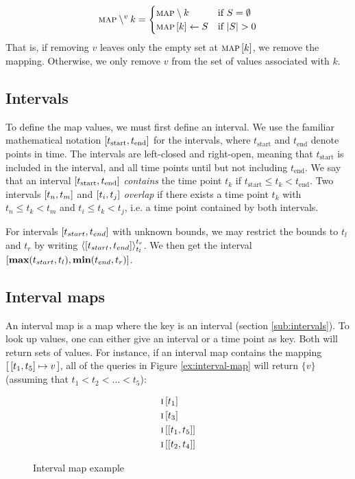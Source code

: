 \[
  \textsc{map} \setminus^{v} k =
  \begin{cases}
    \textsc{map} \setminus k & \text{if } S = \emptyset\\
    \textsc{map} \left[ k \right] \leftarrow S & \text{if } |S| > 0
  \end{cases}
\]
That is, if removing $v$ leaves only the empty set at $\textsc{map} \left[ k \right]$, we remove the mapping. Otherwise, we only remove $v$ from the set of values associated with $k$. 

\subsection{Intervals}
\label{sub:intervals}
To define the map values, we must first define an interval. We use the familiar mathematical notation $\interval{t_\text{start}}{t_\text{end}}$ for the intervals, where $t_\text{start}$ and $t_\text{end}$ denote points in time. The intervals are left-closed and right-open, meaning that $t_\text{start}$ is included in the interval, and all time points until but not including $t_\text{end}$. We say that an interval $\interval{t_\text{start}}{t_\text{end}}$ \emph{contains} the time point $t_k$ if $t_\text{start} \leq t_k < t_\text{end}$. Two intervals $\interval{t_n}{t_m}$ and $\interval{t_i}{t_j}$ \emph{overlap} if there exists a time point $t_k$ with $t_n \leq t_k < t_m$ and $t_i \leq t_k < t_j$, i.e. a time point contained by both intervals.

For intervals $\interval{t_{start}}{t_{end}}$ with unknown bounds, we may restrict the bounds to $t_l$ and $t_r$ by writing $\clamp{\interval{t_{start}}{t_{end}}}{t_l}{t_r}$. We then get the interval $\interval{\textbf{max}(t_{start}, t_l)}{\textbf{min}(t_{end}, t_r)}$.

\subsection{Interval maps}
\label{sub:interval-maps}
An interval map is a map where the key is an interval (section \vref{sub:intervals}). To look up values, one can either give an interval or a time point as key. Both will return sets of values. For instance, if an interval map  contains the mapping $\intervalmapping{t_1}{t_5}{v}$, all of the queries in Figure \vref{ex:interval-map} will return $\{v\}$ (assuming that $t_1 < t_2 < \ldots < t_5$):

\begin{figure}[h]
  \begin{align*}
    & \lookup{\map{i}}{t_1} \\
    & \lookup{\map{i}}{t_3} \\
    & \lookup{\map{i}}{\interval{t_1}{t_5}} \\
    & \lookup{\map{i}}{\interval{t_2}{t_4}}
  \end{align*}
  \caption{Interval map example}
  \label{ex:interval-map}
\end{figure}

